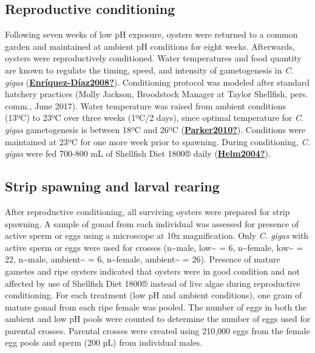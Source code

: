 \documentclass [11pt, proquest] {uwthesis}[2015/03/03]
\begin{document}
\hypertarget{reproductive-conditioning}{%
\subsection{Reproductive conditioning}\label{reproductive-conditioning}}

Following seven weeks of low pH exposure, oysters were returned to a common garden and maintained at ambient pH conditions for eight weeks. Afterwards, oysters were reproductively conditioned. Water temperatures and food quantity are known to regulate the timing, speed, and intensity of gametogenesis in \emph{C. gigas} (\protect\hyperlink{ref-Enruxedquez-Duxedaz2008}{\textbf{Enríquez-Díaz2008?}}). Conditioning protocol was modeled after standard hatchery practices (Molly Jackson, Broodstock Manager at Taylor Shellfish, pers. comm., June 2017). Water temperature was raised from ambient conditions (13ºC) to 23ºC over three weeks (1ºC/2 days), since optimal temperature for \emph{C. gigas} gametogenesis is between 18ºC and 26ºC (\protect\hyperlink{ref-Parker2010}{\textbf{Parker2010?}}). Conditions were maintained at 23ºC for one more week prior to spawning. During conditioning, \emph{C. gigas} were fed 700-800 mL of Shellfish Diet 1800® daily (\protect\hyperlink{ref-Helm2004}{\textbf{Helm2004?}}).

\hypertarget{strip-spawning-and-larval-rearing}{%
\subsection{Strip spawning and larval rearing}\label{strip-spawning-and-larval-rearing}}

After reproductive conditioning, all surviving oysters were prepared for strip spawning. A sample of gonad from each individual was assessed for presence of active sperm or eggs using a microscope at 10x magnification. Only \emph{C. gigas} with active sperm or eggs were used for crosses (n\textasciitilde male, low\textasciitilde{} = 6, n\textasciitilde female, low\textasciitilde{} = 22, n\textasciitilde male, ambient\textasciitilde{} = 6, n\textasciitilde female, ambient\textasciitilde{} = 26). Presence of mature gametes and ripe oysters indicated that oysters were in good condition and not affected by use of Shellfish Diet 1800® instead of live algae during reproductive conditioning. For each treatment (low pH and ambient conditions), one gram of mature gonad from each ripe female was pooled. The number of eggs in both the ambient and low pH pools were counted to determine the number of eggs used for parental crosses. Parental crosses were created using 210,000 eggs from the female egg pools and sperm (200 µL) from individual males.
\end{document}
